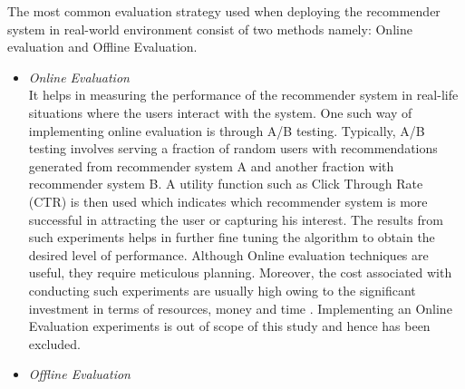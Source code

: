 The most common evaluation strategy used when deploying the recommender system in real-world environment consist of two methods namely: Online evaluation and Offline Evaluation.
\begin{itemize}
	\item \textit{Online Evaluation}\\
	 It helps in measuring the performance of the recommender system in real-life situations where the users interact with the system. One such way of implementing online evaluation is through A/B testing. Typically, A/B testing involves serving a fraction of random users with recommendations generated from recommender system A and another fraction with recommender system B. A utility function such as Click Through Rate (CTR) is then used which indicates which recommender system is more successful in attracting the user or capturing his interest. The results from such experiments helps in further fine tuning the algorithm to obtain the desired level of performance. Although Online evaluation techniques are useful, they require meticulous planning. Moreover, the cost associated with conducting such experiments are usually high owing to the significant investment in terms of resources, money and time \autocite[2941]{gunawardana2009survey}. Implementing an Online Evaluation experiments is out of scope of this study and hence has been excluded.
	\item \textit{Offline Evaluation}

\end{itemize}
